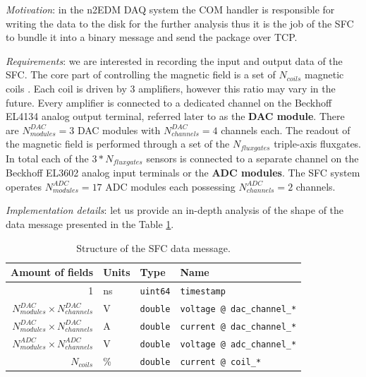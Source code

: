 \textit{Motivation}: in the n2EDM DAQ system the COM handler is responsible for writing the data to the disk for the further analysis thus it is the job of the SFC to bundle it into a binary message and send the package over TCP.

\textit{Requirements}: we are interested in recording the input and output data of the SFC. The core part of controlling the magnetic field is a set of $N_{coils}$ magnetic coils \cite{Rawlik2018}. Each coil is driven by 3 amplifiers, however this ratio may vary in the future. Every amplifier is connected to a dedicated channel on the Beckhoff EL4134 \cite{BeckhoffDAC2019} analog output terminal, referred later to as the \textbf{DAC module}. There are $N_{modules}^{DAC} = 3$ DAC modules with $N_{channels}^{DAC} = 4$ channels each. The readout of the magnetic field is performed through a set of the $N_{fluxgates}$ triple-axis fluxgates. In total each of the $3 * N_{fluxgates}$ sensors is connected to a separate channel on the Beckhoff EL3602 \cite{BeckhoffADC2019} analog input terminals or the \textbf{ADC modules}. The SFC system operates $N_{modules}^{ADC} = 17$ ADC modules each possessing $N_{channels}^{ADC} = 2$ channels. 

\textit{Implementation details}: let us provide an in-depth analysis of the shape of the data message presented in the Table \ref{tbl:sfc_data_message}.

\renewcommand{\arraystretch}{1.4}
\begin{table}[h]
\centering
\begin{tabular}{|r|l|l|l|}
	\hline
	Amount of fields & Units & Type & Name \\
	\hline \hline
	1 & ns & \texttt{uint64} & \texttt{timestamp} \\
	\hline
	$N_{modules}^{DAC} \times N_{channels}^{DAC}$ & V & \texttt{double} & \texttt{voltage @ dac\_channel\_*} \\
	\hline
	$N_{modules}^{DAC} \times N_{channels}^{DAC}$ & A & \texttt{double} & \texttt{current @ dac\_channel\_*} \\
	\hline
	$N_{modules}^{ADC} \times N_{channels}^{ADC}$ & V & \texttt{double} & \texttt{voltage @ adc\_channel\_*} \\
	\hline
	$N_{coils}$ & \% & \texttt{double} & \texttt{current @ coil\_*} \\
	\hline
\end{tabular}
\caption{Structure of the SFC data message.}
\label{tbl:sfc_data_message}
\end{table}
\renewcommand{\arraystretch}{1}

